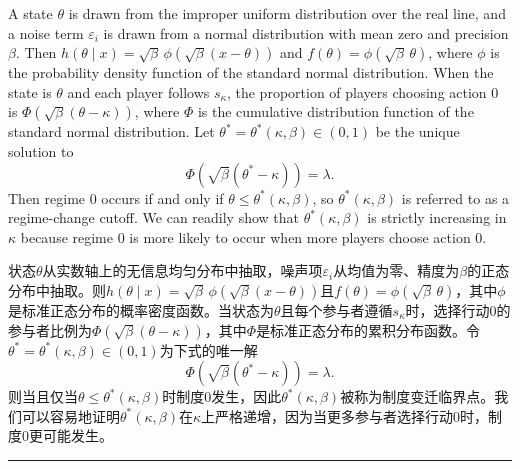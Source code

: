 \documentclass[12pt,a4paper]{article}
\newenvironment{original}
  {\par\medskip\noindent\color{black}\ignorespaces}
  {\par\medskip}
\newenvironment{translation}
  {\par\noindent\color{darkblue}\ignorespaces}
  {\par\medskip\noindent\hrule\par\medskip}
\theoremstyle{definition}
\theoremstyle{remark}
\begin{document}
\begin{original}
A state $\theta$ is drawn from the improper uniform distribution over the real line, and a noise term $\varepsilon_i$ is drawn from a normal distribution with mean zero and precision $\beta$. Then $h(\theta \mid x) = \sqrt{\beta}\,\phi(\sqrt{\beta}(x - \theta))$ and $f(\theta) = \phi(\sqrt{\beta}\,\theta)$, where $\phi$ is the probability density function of the standard normal distribution. When the state is $\theta$ and each player follows $s_\kappa$, the proportion of players choosing action 0 is $\Phi(\sqrt{\beta}(\theta - \kappa))$, where $\Phi$ is the cumulative distribution function of the standard normal distribution. Let $\theta^* = \theta^*(\kappa, \beta) \in (0, 1)$ be the unique solution to
\[
\Phi(\sqrt{\beta}(\theta^* - \kappa)) = \lambda.
\tag{12}
\]
Then regime 0 occurs if and only if $\theta \le \theta^*(\kappa, \beta)$, so $\theta^*(\kappa, \beta)$ is referred to as a regime-change cutoff. We can readily show that $\theta^*(\kappa, \beta)$ is strictly increasing in $\kappa$ because regime 0 is more likely to occur when more players choose action 0.
\end{original}
\begin{translation}
状态$\theta$从实数轴上的无信息均匀分布中抽取，噪声项$\varepsilon_i$从均值为零、精度为$\beta$的正态分布中抽取。则$h(\theta \mid x) = \sqrt{\beta}\,\phi(\sqrt{\beta}(x - \theta))$且$f(\theta) = \phi(\sqrt{\beta}\,\theta)$，其中$\phi$是标准正态分布的概率密度函数。当状态为$\theta$且每个参与者遵循$s_\kappa$时，选择行动0的参与者比例为$\Phi(\sqrt{\beta}(\theta - \kappa))$，其中$\Phi$是标准正态分布的累积分布函数。令$\theta^* = \theta^*(\kappa, \beta) \in (0, 1)$为下式的唯一解
\[
\Phi(\sqrt{\beta}(\theta^* - \kappa)) = \lambda.
\tag{12}
\]
则当且仅当$\theta \le \theta^*(\kappa, \beta)$时制度0发生，因此$\theta^*(\kappa, \beta)$被称为制度变迁临界点。我们可以容易地证明$\theta^*(\kappa, \beta)$在$\kappa$上严格递增，因为当更多参与者选择行动0时，制度0更可能发生。
\end{translation}
\end{document}
